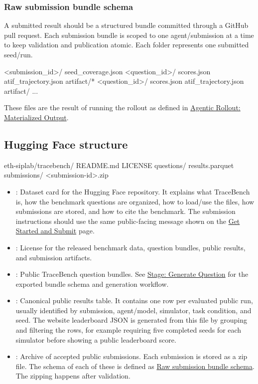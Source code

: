 \documentclass[11pt]{article}
\begin{document}
\label{sec:website-raw-submission-bundle}
\subsubsection*{Raw submission bundle schema}

A submitted result should be a structured bundle committed through a GitHub pull request.
Each submission bundle is scoped to one agent/submission at a time to keep validation and publication atomic.
Each  folder represents one submitted seed/run.

\begin{DocCode}
<submission_id>/
  seed_coverage.json
  <question_id>/
    scores.json
    atif_trajectory.json
    artifact/*
  <question_id>/
    scores.json
    atif_trajectory.json
    artifact/
      ...
\end{DocCode}
These files are the result of running the rollout as defined in \hyperref[sec:agentic-rollout-materialized-output]{Agentic Rollout: Materialized Output}.


\subsection*{Hugging Face structure}
\begin{DocCode}
eth-siplab/tracebench/
  README.md
  LICENSE
  questions/
  results.parquet
  submissions/
    <submission-id>.zip
\end{DocCode}
\begin{itemize}
    \item {}: Dataset card for the Hugging Face repository. 
    It explains what TraceBench is, how the benchmark questions are organized, how to load/use the files, how submissions are stored, and how to cite the benchmark.
    The submission instructions should use the same public-facing message shown on the \hyperref[sec:website-page-get-started]{Get Started and Submit} page.
    \item {}: License for the released benchmark data, question bundles, public results, and submission artifacts.
    \item {}: Public TraceBench question bundles.
    See \hyperref[docstart:generate_question_stage]{Stage: Generate Question} for the exported bundle schema and generation workflow.
    \item {}: Canonical public results table. 
    It contains one row per evaluated public run, usually identified by submission, agent/model, simulator, task condition, and seed. 
    The website leaderboard JSON is generated from this file by grouping and filtering the rows, for example requiring five completed seeds for each simulator before showing a public leaderboard score.
    \item {}: Archive of accepted public submissions. 
    Each submission is stored as a zip file. 
    The schema of each of these is defined as \hyperref[sec:website-raw-submission-bundle]{Raw submission bundle schema}.
    The zipping happens after validation.
\end{itemize}
\end{document}
